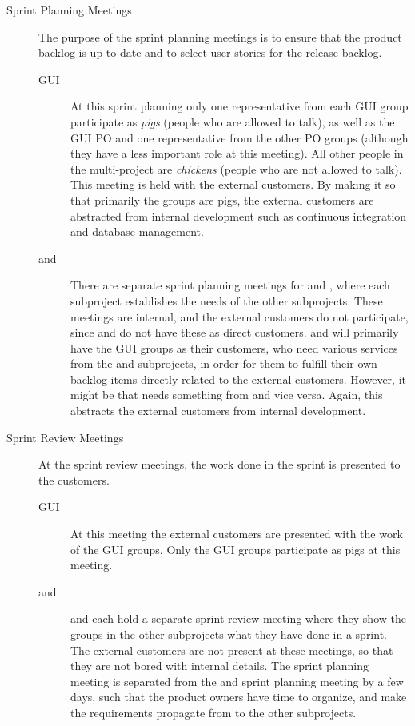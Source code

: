 \begin{description}
  \item[Sprint Planning Meetings]
  The purpose of the sprint planning meetings is to ensure that the product backlog is up to date and to select user stories for the release backlog.
  \begin{description}
    \item[GUI] At this sprint planning only one representative from each GUI group participate as \emph{pigs} (people who are allowed to talk), as well as the GUI PO and one representative from the other PO groups (although they have a less important role at this meeting). All other people in the multi-project are \emph{chickens} (people who are not allowed to talk). This meeting is held with the external customers. By making it so that primarily the \gui groups are pigs, the external customers are abstracted from internal development such as continuous integration and database management.
    \item[\db and \bd] There are separate sprint planning meetings for \db and \bd, where each subproject establishes the needs of the other subprojects. These meetings are internal, and the external customers do not participate, since \db and \bd do not have these as direct customers. \db and \bd will primarily have the GUI groups as their customers, who need various services from the \db and \bd subprojects, in order for them to fulfill their own backlog items directly related to the external customers. However, it might be that \db needs something from \bd and vice versa. Again, this abstracts the external customers from internal development.
  \end{description}
  \item[Sprint Review Meetings]
  At the sprint review meetings, the work done in the sprint is presented to the customers.
  \begin{description}
    \item[GUI] At this meeting the external customers are presented with the work of the GUI groups. Only the GUI groups participate as pigs at this meeting.
    \item[\db and \bd] \db and \bd each hold a separate sprint review meeting where they show the groups in the other subprojects what they have done in a sprint. The external customers are not present at these meetings, so that they are not bored with internal details. The \gui sprint planning meeting is separated from the \db and \bd sprint planning meeting by a few days, such that the product owners have time to organize, and make the requirements propagate from \gui to the other subprojects.

\end{description}
\end{description}
